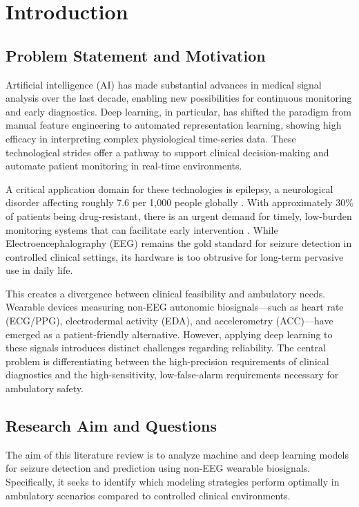 \section{Introduction}

\subsection{Problem Statement and Motivation}

Artificial intelligence (AI) has made substantial advances in medical
signal analysis over the last decade, enabling new possibilities for
continuous monitoring and early diagnostics. Deep learning, in
particular, has shifted the paradigm from manual feature engineering to
automated representation learning, showing high efficacy in
interpreting complex physiological time-series data. These technological
strides offer a pathway to support clinical decision-making and
automate patient monitoring in real-time environments.

A critical application domain for these technologies is epilepsy, a
neurological disorder affecting roughly 7.6 per 1,000 people globally
\parencite{beghiEpidemiologyEpilepsy2019}. With approximately 30\%
of patients being drug-resistant, there is an urgent demand for timely,
low-burden monitoring systems that can facilitate early
intervention \parencite{kwanEarlyIdentificationRefractory2000}. While
Electroencephalography (EEG) remains the gold standard for seizure
detection in controlled clinical settings, its hardware is too
obtrusive for long-term pervasive use in daily life.

This creates a divergence between clinical feasibility and ambulatory
needs. Wearable devices measuring non-EEG autonomic biosignals—such as
heart rate (ECG/PPG), electrodermal activity (EDA), and
accelerometry (ACC)—have emerged as a patient-friendly alternative.
However, applying deep learning to these signals introduces distinct
challenges regarding reliability. The central problem is
differentiating between the high-precision requirements of clinical
diagnostics and the high-sensitivity, low-false-alarm requirements
necessary for ambulatory safety.

\subsection{Research Aim and Questions}
The aim of this literature review is to analyze machine and deep
learning models for seizure detection and prediction using non-EEG
wearable biosignals. Specifically, it seeks to identify which modeling
strategies perform optimally in ambulatory scenarios compared to
controlled clinical environments.

